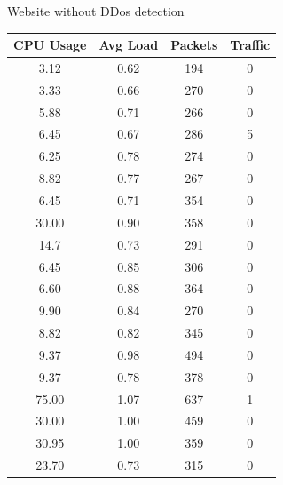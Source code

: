 \documentclass[12pt]{article}
\begin{document}
\makeatletter{}\makeatother
\begin{minipage}{.60\textwidth}
\centering
\caption{Website without DDos detection}
\begin{tabular}{|c|c|c|c|}
\hline
  CPU Usage & Avg Load & Packets & Traffic
 \\
  \hline
  3.12 & 0.62 & 194 & 0 \\
  3.33 & 0.66 & 270 & 0\\
  5.88 & 0.71 & 266 & 0\\
  6.45 & 0.67 & 286 & 5\\
  6.25 & 0.78 & 274 & 0\\
  8.82 & 0.77 & 267 & 0\\
  6.45 & 0.71 & 354 & 0\\
 30.00 & 0.90 & 358 & 0\\
  14.7 & 0.73 & 291 & 0\\
  6.45 & 0.85 & 306 & 0\\
  6.60 & 0.88 & 364 & 0\\
  9.90 & 0.84 & 270 & 0\\
  8.82 & 0.82 & 345 & 0\\
  9.37 & 0.98 & 494 & 0\\
  9.37 & 0.78 & 378 & 0\\
 75.00 & 1.07 & 637 & 1\\
 30.00 & 1.00 & 459 & 0\\
 30.95 & 1.00 & 359 & 0\\
 23.70 & 0.73 & 315 & 0\\
    \hline
\end{tabular}
\end{minipage}
\makeatletter{}\makeatother
\end{document}
